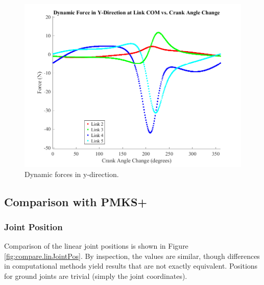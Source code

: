 \documentclass[12pt]{article}
\begin{document}
\begin{figure}[H]
  \centering
  \includegraphics[scale=0.7]{../matlab-plots/dynamicForcesY.png}
  \caption{\label{fig:dyn-f-y}Dynamic forces in y-direction.}
\end{figure}

\subsection{Comparison with PMKS+}%
\label{res.compare}

\subsubsection{Joint Position}%
\label{res.compare.linJointPos}

Comparison of the linear joint positions is shown in Figure \ref{fig:compare.linJointPos}. By inspection, the values are similar, though differences in computational methods yield results that are not exactly equivalent. Positions for ground joints are trivial (simply the joint coordinates).
\end{document}
